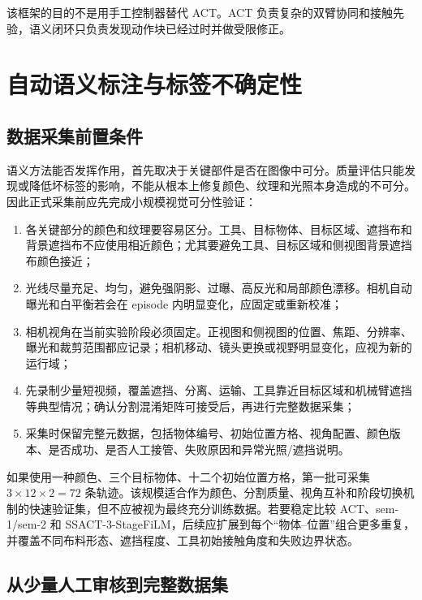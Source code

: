 \documentclass[UTF8,a4paper,11pt]{ctexart}
\begin{document}
该框架的目的不是用手工控制器替代 ACT。ACT 负责复杂的双臂协同和接触先验，语义闭环只负责发现动作块已经过时并做受限修正。

\section{自动语义标注与标签不确定性}

\subsection{数据采集前置条件}

语义方法能否发挥作用，首先取决于关键部件是否在图像中可分。质量评估只能发现或降低坏标签的影响，不能从根本上修复颜色、纹理和光照本身造成的不可分。因此正式采集前应先完成小规模视觉可分性验证：
\begin{enumerate}[leftmargin=2.3em]
  \item 各关键部分的颜色和纹理要容易区分。工具、目标物体、目标区域、遮挡布和背景遮挡布不应使用相近颜色；尤其要避免工具、目标区域和侧视图背景遮挡布颜色接近；
  \item 光线尽量充足、均匀，避免强阴影、过曝、高反光和局部颜色漂移。相机自动曝光和白平衡若会在 episode 内明显变化，应固定或重新校准；
  \item 相机视角在当前实验阶段必须固定。正视图和侧视图的位置、焦距、分辨率、曝光和裁剪范围都应记录；相机移动、镜头更换或视野明显变化，应视为新的运行域；
  \item 先录制少量短视频，覆盖遮挡、分离、运输、工具靠近目标区域和机械臂遮挡等典型情况；确认分割混淆矩阵可接受后，再进行完整数据采集；
  \item 采集时保留完整元数据，包括物体编号、初始位置方格、视角配置、颜色版本、是否成功、是否人工接管、失败原因和异常光照/遮挡说明。
\end{enumerate}

如果使用一种颜色、三个目标物体、十二个初始位置方格，第一批可采集 $3\times12\times2=72$ 条轨迹。该规模适合作为颜色、分割质量、视角互补和阶段切换机制的快速验证集，但不应被视为最终充分训练数据。若要稳定比较 ACT、sem-1/sem-2 和 SSACT-3-StageFiLM，后续应扩展到每个“物体--位置”组合更多重复，并覆盖不同布料形态、遮挡程度、工具初始接触角度和失败边界状态。

\subsection{从少量人工审核到完整数据集}
\end{document}
